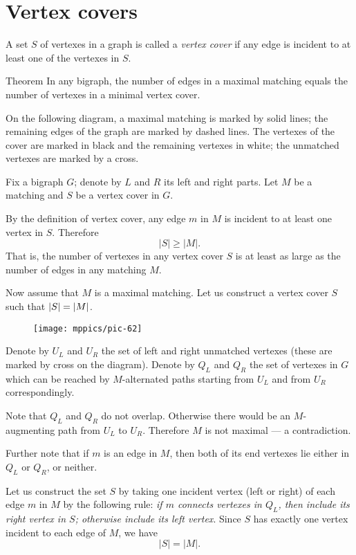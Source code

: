 \section*{Vertex covers}

A set $S$ of vertexes in a graph is called a \emph{vertex cover} if any edge is incident to at least one of the vertexes in $S$.

\begin{thm}{Theorem}
In any bigraph, the number of edges in a maximal matching equals the number of vertexes in a minimal vertex cover.
\end{thm}

On the following diagram, a maximal matching is marked by solid lines;
the remaining edges of the graph are marked by dashed lines.
The vertexes of the cover are marked in black and the remaining vertexes in white;
the unmatched vertexes are marked by a cross.

Fix a bigraph $G$;
denote by $L$ and $R$ its left and right parts.
Let $M$ be a matching and $S$ be a vertex cover in $G$.

By the definition of vertex cover, any edge $m$ in $M$ is incident to at least one vertex in $S$.
Therefore 
\[|S|\ge |M|.\] 
That is, the number of vertexes in any vertex cover $S$ is at least as large as the number of edges in any matching $M$.

Now assume that $M$ is a maximal matching.
Let us construct a vertex cover $S$ such that $|S|\z=|M|$.

\begin{wrapfigure}{o}{30 mm}
\vskip-4mm
\centering
\texttt{[image: mppics/pic-62]}
\vskip2mm
\end{wrapfigure}


Denote by $U_L$ and $U_R$ the set of left and right unmatched vertexes (these are marked by cross on the diagram).
Denote by $Q_L$ and $Q_R$ the set of vertexes in $G$ which can be reached by $M$-alternated paths starting from $U_L$ and from $U_R$ correspondingly.

Note that $Q_L$ and $Q_R$ do not overlap.
Otherwise there would be an $M$-augmenting path from $U_L$ to $U_R$.
Therefore $M$ is not maximal --- a contradiction.

Further note that if $m$ is an edge in $M$, then both of its end vertexes lie either in $Q_L$ or $Q_R$, or neither.

Let us construct the set $S$ by taking one incident vertex (left or right) of each edge $m$ in $M$ by the following rule:
\emph{if $m$ connects vertexes in $Q_L$, then include its right vertex in $S$;
otherwise include its left vertex}.
Since $S$ has exactly one vertex incident to each edge of $M$, we have
\[|S|=|M|.\]

